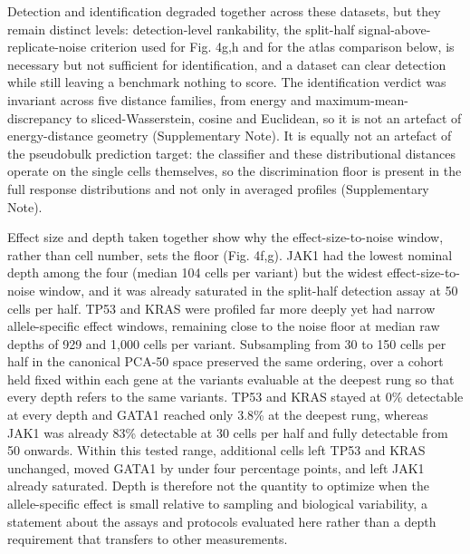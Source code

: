 \documentclass[11pt,letterpaper]{article}
\begin{document}
Detection and identification degraded together across these datasets, but they remain distinct levels: detection-level rankability, the split-half signal-above-replicate-noise criterion used for Fig. 4g,h and for the atlas comparison below, is necessary but not sufficient for identification, and a dataset can clear detection while still leaving a benchmark nothing to score. The identification verdict was invariant across five distance families, from energy and maximum-mean-discrepancy to sliced-Wasserstein, cosine and Euclidean, so it is not an artefact of energy-distance geometry (Supplementary Note). It is equally not an artefact of the pseudobulk prediction target: the classifier and these distributional distances operate on the single cells themselves, so the discrimination floor is present in the full response distributions and not only in averaged profiles (Supplementary Note).

Effect size and depth taken together show why the effect-size-to-noise window, rather than cell number, sets the floor (Fig. 4f,g). JAK1 had the lowest nominal depth among the four (median 104 cells per variant) but the widest effect-size-to-noise window, and it was already saturated in the split-half detection assay at 50 cells per half. TP53 and KRAS were profiled far more deeply yet had narrow allele-specific effect windows, remaining close to the noise floor at median raw depths of 929 and 1,000 cells per variant. Subsampling from 30 to 150 cells per half in the canonical PCA-50 space preserved the same ordering, over a cohort held fixed within each gene at the variants evaluable at the deepest rung so that every depth refers to the same variants. TP53 and KRAS stayed at 0\% detectable at every depth and GATA1 reached only 3.8\% at the deepest rung, whereas JAK1 was already 83\% detectable at 30 cells per half and fully detectable from 50 onwards. Within this tested range, additional cells left TP53 and KRAS unchanged, moved GATA1 by under four percentage points, and left JAK1 already saturated. Depth is therefore not the quantity to optimize when the allele-specific effect is small relative to sampling and biological variability, a statement about the assays and protocols evaluated here rather than a depth requirement that transfers to other measurements.
\end{document}
